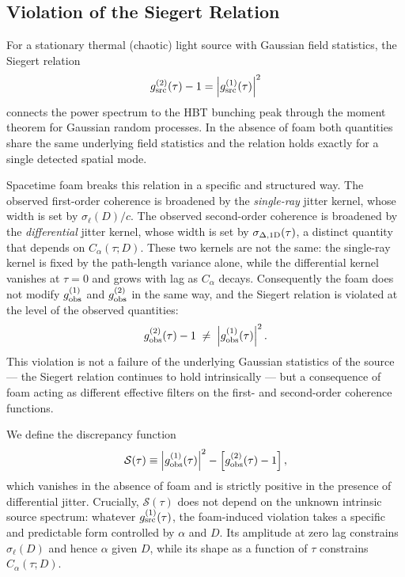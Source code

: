 \documentclass[aps,prd,onecolumn,amsmath,amssymb]{revtex4-2}
\begin{document}
\subsection{Violation of the Siegert Relation}
\label{sec:siegert}

For a stationary thermal (chaotic) light source with Gaussian field statistics,
the Siegert relation
\begin{equation}
  g^{(2)}_{\rm src}(\tau) - 1 = \left|g^{(1)}_{\rm src}(\tau)\right|^2
  \label{eq:Siegert}
\end{equation}
connects the power spectrum to the HBT bunching peak through the moment theorem
for Gaussian random processes.
In the absence of foam both quantities share the same underlying field
statistics and the relation holds exactly for a single detected spatial mode.

Spacetime foam breaks this relation in a specific and structured way.
The observed first-order coherence is broadened by the \emph{single-ray}
jitter kernel, whose width is set by $\sigma_\ell(D)/c$.
The observed second-order coherence is broadened by the \emph{differential}
jitter kernel, whose width is set by $\sigma_{\Delta,{\rm 1D}}(\tau)$, a
distinct quantity that depends on $C_\alpha(\tau;D)$.
These two kernels are not the same: the single-ray kernel is fixed by the
path-length variance alone, while the differential kernel vanishes at $\tau=0$
and grows with lag as $C_\alpha$ decays.
Consequently the foam does not modify $g^{(1)}_{\rm obs}$ and
$g^{(2)}_{\rm obs}$ in the same way, and the Siegert relation is violated at
the level of the observed quantities:
\begin{equation}
  g^{(2)}_{\rm obs}(\tau) - 1 \;\neq\; \left|g^{(1)}_{\rm obs}(\tau)\right|^2.
  \label{eq:SiegertViolation}
\end{equation}
This violation is not a failure of the underlying Gaussian statistics of the
source — the Siegert relation continues to hold intrinsically — but a
consequence of foam acting as different effective filters on the first- and
second-order coherence functions.

We define the discrepancy function
\begin{equation}
  \mathcal{S}(\tau)
  \equiv \left|g^{(1)}_{\rm obs}(\tau)\right|^2
         - \left[g^{(2)}_{\rm obs}(\tau) - 1\right],
  \label{eq:SiegertDiscrepancy}
\end{equation}
which vanishes in the absence of foam and is strictly positive in the presence
of differential jitter.
Crucially, $\mathcal{S}(\tau)$ does not depend on the unknown intrinsic source
spectrum: whatever $g^{(1)}_{\rm src}(\tau)$, the foam-induced violation takes
a specific and predictable form controlled by $\alpha$ and $D$.
Its amplitude at zero lag constrains $\sigma_\ell(D)$ and hence $\alpha$ given
$D$, while its shape as a function of $\tau$ constrains $C_\alpha(\tau;D)$.
\end{document}
